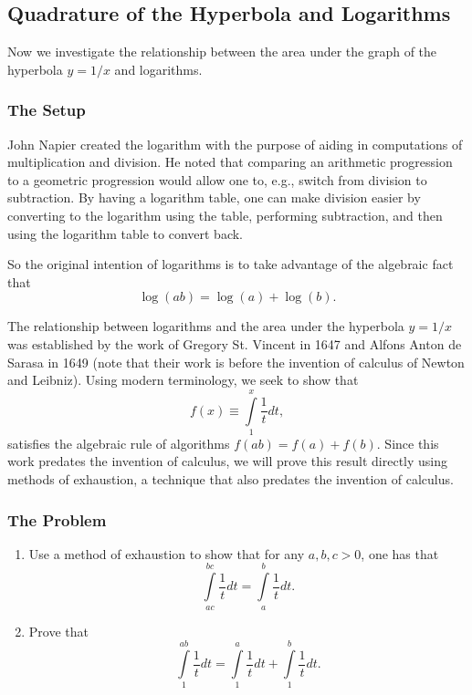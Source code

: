 \subsection{Quadrature of the Hyperbola and Logarithms}

Now we investigate the relationship between the area under the graph of the hyperbola \(y = 1 / x\) and 
logarithms.

\subsubsection*{The Setup}

John Napier created the logarithm with the purpose of aiding in computations of multiplication and division. \cite{cajori} 
He noted that comparing an arithmetic progression to a geometric progression would allow one to, e.g., switch from
division to subtraction. By having a logarithm table, one can make division easier by converting to the
logarithm using the table, performing subtraction, and then using the logarithm table to convert back. 

So the original intention of logarithms is to take advantage of the algebraic fact that 
\begin{equation}
\log(ab) = \log(a) + \log(b).
\end{equation}

The relationship between logarithms and the area under the hyperbola \(y = 1/x\) was established by the work
of Gregory St. Vincent in 1647 and Alfons Anton de Sarasa in 1649 (note that their work is before the 
invention of calculus of Newton and Leibniz). Using modern terminology, we seek to show that 
\begin{equation}
f(x) \equiv \int\limits_1^x \frac{1}{t} dt,
\end{equation}
satisfies the algebraic rule of algorithms \(f(ab) = f(a) + f(b)\). Since this work predates the invention
of calculus, we will prove this result directly using methods of exhaustion, a technique that also predates
the invention of calculus.

\subsubsection*{The Problem}

\begin{enumerate}
\item Use a method of exhaustion to show that for any \(a, b, c > 0\), one has that
\begin{equation}
\int\limits_{ac}^{bc} \frac{1}{t} dt = \int\limits_a^b \frac{1}{t} dt.
\end{equation} 

\item Prove that
\begin{equation}
\int\limits_1^{ab} \frac{1}{t} dt = \int\limits_1^a \frac{1}{t} dt + \int\limits_1^b \frac{1}{t} dt.
\end{equation}
\end{enumerate}

